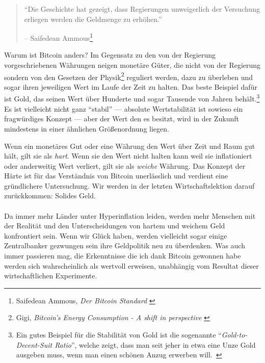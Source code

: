 \begin{quotation}\begin{samepage}
\enquote{Die Geschichte hat gezeigt, dass Regierungen unweigerlich der
Versuchung erliegen werden die Geldmenge zu erhöhen.}
\begin{flushright} -- Saifedean Ammous\footnote{Saifedean Ammous, \textit{Der
Bitcoin Standard} \cite{bitcoin-standard}}
\end{flushright}\end{samepage}\end{quotation}

Warum ist Bitcoin anders? Im Gegensatz zu den von der Regierung vorgeschriebenen
Währungen neigen monetäre Güter, die nicht von der Regierung sondern von den
Gesetzen der Physik\footnote{Gigi, \textit{Bitcoin's Energy Consumption - A
shift in perspective} \cite{gigi:energy}} reguliert werden, dazu zu überleben
und sogar ihren jeweiligen Wert im Laufe der Zeit zu halten. Das beste Beispiel
dafür ist Gold, das seinen Wert über Hunderte und sogar Tausende von Jahren
behält.\footnote{Ein gutes Beispiel für die Stabilität von Gold ist die
sogenannte \enquote{\textit{Gold-to-Decent-Suit Ratio}}, welche zeigt, dass man
seit jeher in etwa eine Unze Gold ausgeben muss, wenn man einen schönen Anzug
erwerben will.~\cite{web:gold-to-decent-suite-ratio}} Es ist vielleicht nicht
ganz \enquote{stabil} --- absolute Wertstabilität ist sowieso ein fragwürdiges
Konzept --- aber der Wert den es besitzt, wird in der Zukunft mindestens in
einer ähnlichen Größenordnung liegen.

Wenn ein monetäres Gut oder eine Währung den Wert über Zeit und Raum gut hält,
gilt sie als \textit{hart}. Wenn sie den Wert nicht halten kann weil sie
inflationiert oder anderweitig Wert verliert, gilt sie als \textit{weiche}
Währung. Das Konzept der Härte ist für das Verständnis von Bitcoin unerlässlich
und verdient eine gründlichere Untersuchung. Wir werden in der letzten
Wirtschaftslektion darauf zurückkommen: Solides Geld.

\paragraph{}
Da immer mehr Länder unter Hyperinflation leiden, werden mehr Menschen mit der
Realität und den Unterscheidungen von hartem und weichem Geld konfrontiert sein.
Wenn wir Glück haben, werden vielleicht sogar einige Zentralbanker gezwungen sein
ihre Geldpolitik neu zu überdenken. Was auch immer passieren mag, die
Erkenntnisse die ich dank Bitcoin gewonnen habe werden sich wahrscheinlich als
wertvoll erweisen, unabhängig vom Resultat dieser wirtschaftlichen Experimente.

